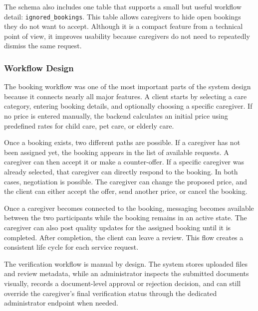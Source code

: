 \documentclass[12pt,a4paper]{article}
\begin{document}
The schema also includes one table that supports a small but useful workflow detail: \texttt{ignored\_bookings}. This table allows caregivers to hide open bookings they do not want to accept. Although it is a compact feature from a technical point of view, it improves usability because caregivers do not need to repeatedly dismiss the same request.

\subsubsection{Workflow Design}

The booking workflow was one of the most important parts of the system design because it connects nearly all major features. A client starts by selecting a care category, entering booking details, and optionally choosing a specific caregiver. If no price is entered manually, the backend calculates an initial price using predefined rates for child care, pet care, or elderly care.

Once a booking exists, two different paths are possible. If a caregiver has not been assigned yet, the booking appears in the list of available requests. A caregiver can then accept it or make a counter-offer. If a specific caregiver was already selected, that caregiver can directly respond to the booking. In both cases, negotiation is possible. The caregiver can change the proposed price, and the client can either accept the offer, send another price, or cancel the booking.

Once a caregiver becomes connected to the booking, messaging becomes available between the two participants while the booking remains in an active state. The caregiver can also post quality updates for the assigned booking until it is completed. After completion, the client can leave a review. This flow creates a consistent life cycle for each service request.

The verification workflow is manual by design. The system stores uploaded files and review metadata, while an administrator inspects the submitted documents visually, records a document-level approval or rejection decision, and can still override the caregiver's final verification status through the dedicated administrator endpoint when needed.
\end{document}
